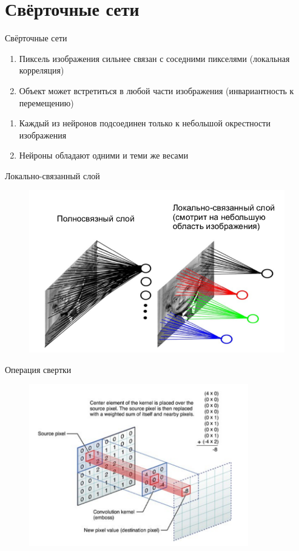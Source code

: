 \documentclass[10pt]{beamer}
\begin{document}
\section{Свёрточные сети}

{
\begin{frame}{Свёрточные сети}
  \begin{enumerate}
    \item Пиксель изображения сильнее связан с соседними пикселями (локальная корреляция)
		\item Объект может встретиться в любой части изображения (инвариантность к перемещению)
  \end{enumerate}
  \pause
  \begin{enumerate}
    \item Каждый из нейронов подсоединен только к небольшой окрестности изображения
    \item Нейроны обладают одними и теми же весами 
  \end{enumerate}
\end{frame}
}

\begin{frame}{Локально-связанный слой}
	\begin{figure}[htbp]
	  \includegraphics[height=200pt, keepaspectratio = true]{images/local_layer}   
	\end{figure}
\end{frame}

\begin{frame}{Операция свертки}
	\begin{figure}[htbp]
	  \includegraphics[height=200pt, keepaspectratio = true]{images/conv}   
	\end{figure}
\end{frame}
\end{document}
